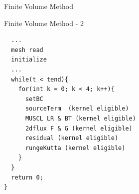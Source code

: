 \begin{frame}[t]{Finite Volume Method}
\end{frame}


\begin{frame}[fragile]{Finite Volume Method - 2}
\begin{lstlisting}
  ...
  mesh read
  initialize
  ...
  while(t < tend){
    for(int k = 0; k < 4; k++){
      setBC
      sourceTerm  (kernel eligible)
      MUSCL LR & BT (kernel eligible)
      2dflux F & G (kernel eligible)
      residual (kernel eligible)
      rungeKutta (kernel eligible)
    }
  }
  return 0;
}
\end{lstlisting}
\end{frame}

